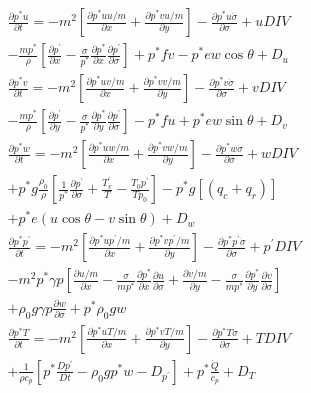 \begin{gather}
\label{non-hydro-eq-first}
\frac{\partial{p^{\ast} u}}{\partial{t}} = -m^2 \left[ 
	\frac{\partial{p^{\ast} uu/m}}{\partial{x}} + 
\frac{\partial{p^{\ast} vu/m}}{\partial{y}}\right] -
	\frac{\partial{p^{\ast} u \dot{\sigma}}}{\partial{\sigma}} + 
	uDIV \\ \nonumber
	-\frac{mp^{\ast}}{\rho} \left[
		\frac{\partial{p^\prime}}{\partial{x}} -
		\frac{\sigma}{p^{\ast}}
		\frac{\partial{p^{\ast}}}{\partial{x}}
	        \frac{\partial{p^\prime}}{\partial{\sigma}}\right] +
	p^{\ast}fv - p^{\ast} ew \cos\theta + D_u  \\
\frac{\partial{p^{\ast} v}}{\partial{t}}= -m^2 \left[ 
	\frac{\partial{p^{\ast} uv/m}}{\partial{x}} + 
	\frac{\partial{p^{\ast} vv/m}}{\partial{y}}\right] -
	\frac{\partial{p^{\ast} v \dot{\sigma}}}{\partial{\sigma}}+ 
	vDIV \\ \nonumber
	-\frac{mp^{\ast}}{\rho} \left[
		\frac{\partial{p^\prime}}{\partial{y}} -
		\frac{\sigma}{p^{\ast}}
		\frac{\partial{p^{\ast}}}{\partial{y}}
		\frac{\partial{p^\prime}}{\partial{\sigma}} \right] -
	p^{\ast}fu + p^{\ast} ew \sin\theta + D_v \\
\frac{\partial{p^{\ast} w}}{\partial{t}} = -m^2 \left[ 
	\frac{\partial{p^{\ast} uw/m}}{\partial{x}} + 
	\frac{\partial{p^{\ast} vw/m}}{\partial{y}}\right] -
	\frac{\partial{p^{\ast} w \dot{\sigma}}}{\partial{\sigma}} + 
	wDIV \\ \nonumber
	+ p^{\ast}g\frac{\rho_0}\rho{}\left[
		\frac{1}{p^{\ast}}
		\frac{\partial{p^\prime}}{\partial{\sigma}} +
		\frac{T^{\prime}_{v}}{T} -
		\frac{T_0 p^\prime}{Tp_0} \right]
	-p^{\ast} g \left[\left(q_c+q_r\right)\right] \\ \nonumber
	+ p^{\ast} e \left( u\cos\theta - v\sin\theta \right) + D_w \\
\frac{\partial{p^{\ast} p^\prime}}{\partial{t}} = -m^2 \left[ 
	\frac{\partial{p^{\ast} up^\prime/m}}{\partial{x}} + 
	\frac{\partial{p^{\ast} vp^\prime/m}}{\partial{y}}\right] -
	\frac{\partial{p^{\ast} p^\prime \dot{\sigma}}}{\partial{\sigma}} + 
	p^{\prime}DIV \\ \nonumber
	- m^2 p^{\ast} \gamma p \left[
		\frac{\partial{u/m}}{\partial{x}} -
		\frac{\sigma}{mp^{\ast}}
		\frac{\partial{p^{\ast}}}{\partial{x}}
		\frac{\partial{u}}{\partial{\sigma}} + 
		\frac{\partial{v/m}}{\partial{y}} -
		\frac{\sigma}{mp^{\ast}}
		\frac{\partial{p^{\ast}}}{\partial{y}}
		\frac{\partial{v}}{\partial{\sigma}} \right] \\ \nonumber
	+ \rho_0 g \gamma p \frac{\partial{w}}{\partial{\sigma}} +
	p^{\ast} \rho_0 gw \\
\label{non-hydro-eq-last}
\frac{\partial{p^{\ast} T}}{\partial{t}} = -m^2 \left[
	\frac{\partial{p^{\ast} uT/m}}{\partial{x}} +
	\frac{\partial{p^{\ast} vT/m}}{\partial{y}} \right] -
	\frac{\partial{p^{\ast} T \dot{\sigma}}}{\partial{\sigma}} +
	TDIV \\ \nonumber
	+\frac{1}{\rho c_p}\left[p^{\ast}\frac{Dp^{\prime}}{Dt} -
	\rho_0gp^{\ast}w -D_{p^\prime}\right] +
	p^{\ast}\frac{\dot{Q}}{c_p} +D_T
\end{gather}


